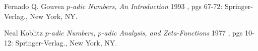 \documentclass[12pt]{amsart}
\theoremstyle{plain}
\theoremstyle{definition}
\begin{document}
\begin{thebibliography}{1}


 Fernado Q. Gouvea {\em $p$-adic Numbers, An Introduction} 1993 , pgs 67-72:
Springer-Verlag., New York, NY.



 Neal Koblitz {\em $p$-adic Numbers, $p$-adic Analysis, and Zeta-Functions} 1977 , pgs 10-12:
Springer-Verlag., New York, NY.

\end{thebibliography}
\end{document}
